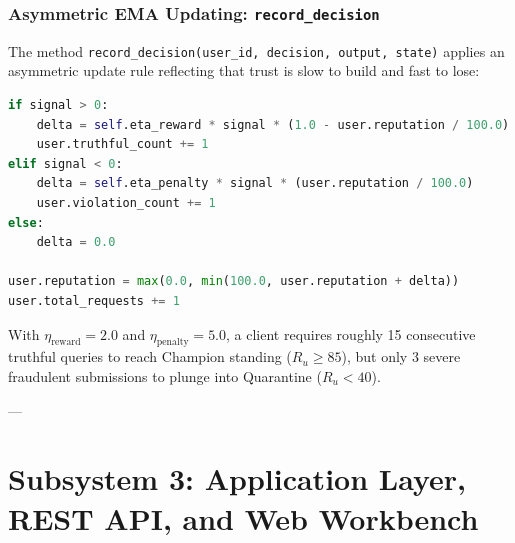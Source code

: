 \documentclass[11pt,a4paper]{article}
\begin{document}
\subsubsection{Asymmetric EMA Updating: \texttt{record\_decision}}
The method \texttt{record\_decision(user\_id, decision, output, state)} applies an asymmetric update rule reflecting that trust is slow to build and fast to lose:
\begin{lstlisting}[language=Python]
if signal > 0:
    delta = self.eta_reward * signal * (1.0 - user.reputation / 100.0)
    user.truthful_count += 1
elif signal < 0:
    delta = self.eta_penalty * signal * (user.reputation / 100.0)
    user.violation_count += 1
else:
    delta = 0.0

user.reputation = max(0.0, min(100.0, user.reputation + delta))
user.total_requests += 1
\end{lstlisting}
With $\eta_{\text{reward}} = 2.0$ and $\eta_{\text{penalty}} = 5.0$, a client requires roughly 15 consecutive truthful queries to reach Champion standing ($R_u \ge 85$), but only 3 severe fraudulent submissions to plunge into Quarantine ($R_u < 40$).

---

\section{Subsystem 3: Application Layer, REST API, and Web Workbench}
\end{document}
